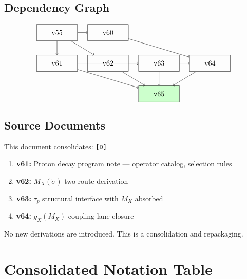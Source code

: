 \documentclass[11pt,a4paper]{article}
\newcommand{\tagD}{\textcolor{green!50!black}{\texttt{[D]}}}
\theoremstyle{definition}
\begin{document}
\subsection{Dependency Graph}
\label{subsec:dependency-graph}

\begin{equation}
\label{eq:dependency-graph}
\begin{tikzpicture}[baseline=(current bounding box.center),
  node distance=1.5cm,
  box/.style={rectangle, draw, minimum width=2cm, minimum height=0.8cm}]
\node[box] (v55) {v55};
\node[box, right of=v55, xshift=1cm] (v60) {v60};
\node[box, below of=v55] (v61) {v61};
\node[box, right of=v61, xshift=1cm] (v62) {v62};
\node[box, right of=v62, xshift=1cm] (v63) {v63};
\node[box, right of=v63, xshift=1cm] (v64) {v64};
\node[box, below of=v63, fill=green!20] (v65) {v65};
\draw[->] (v55) -- (v60);
\draw[->] (v55) -- (v61);
\draw[->] (v55) -- (v62);
\draw[->] (v60) -- (v64);
\draw[->] (v61) -- (v63);
\draw[->] (v62) -- (v63);
\draw[->] (v63) -- (v64);
\draw[->] (v61) -- (v65);
\draw[->] (v62) -- (v65);
\draw[->] (v63) -- (v65);
\draw[->] (v64) -- (v65);
\end{tikzpicture}
\end{equation}

\subsection{Source Documents}
\label{subsec:source-docs}

This document consolidates: \tagD{}
\begin{enumerate}
  \item \textbf{v61:} Proton decay program note --- operator catalog, selection rules
  \item \textbf{v62:} $M_X(\tilde{\sigma})$ two-route derivation
  \item \textbf{v63:} $\tau_p$ structural interface with $M_X$ absorbed
  \item \textbf{v64:} $g_X(M_X)$ coupling lane closure
\end{enumerate}

No new derivations are introduced. This is a consolidation and repackaging.

\section{Consolidated Notation Table}
\label{sec:notation}
\end{document}
